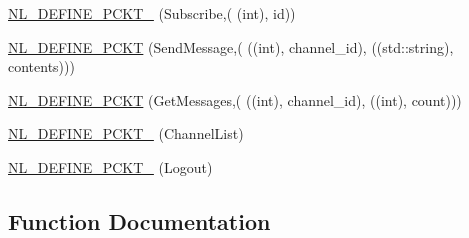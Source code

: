 \begin{DoxyCompactItemize}
\hyperlink{namespaceexample_1_1to__s_a29e3a089b479f8dd619fdbf4ebb6b6bd}{N\+L\+\_\+\+D\+E\+F\+I\+N\+E\+\_\+\+P\+C\+K\+T\+\_} (Subscribe,(                                                                                                   
                                                                                                           (int), id))
\item 
\hyperlink{namespaceexample_1_1to__s_acf8fc2468fd6df5ba81aee0681ab9b40}{N\+L\+\_\+\+D\+E\+F\+I\+N\+E\+\_\+\+P\+C\+K\+T} (Send\+Message,(                                                                                                                                                           
                                                                                                   ((int), channel\+\_\+id),                   
                                                                                                   ((std\+::string), contents)))
\item 
\hyperlink{namespaceexample_1_1to__s_aba7eca9145725bd852017768b0563163}{N\+L\+\_\+\+D\+E\+F\+I\+N\+E\+\_\+\+P\+C\+K\+T} (Get\+Messages,(                                                                                                                                   
                                                                                                   ((int), channel\+\_\+id),                                                                                                   ((int), count)))
\item 
\hyperlink{namespaceexample_1_1to__s_aaf777f6423de0654c5555ae32e182638}{N\+L\+\_\+\+D\+E\+F\+I\+N\+E\+\_\+\+P\+C\+K\+T\+\_} (Channel\+List)
\item 
\hyperlink{namespaceexample_1_1to__s_ac88cfa8b7faa1cb4b0718f43f951cdb9}{N\+L\+\_\+\+D\+E\+F\+I\+N\+E\+\_\+\+P\+C\+K\+T\+\_} (Logout)
\end{DoxyCompactItemize}


\subsection{Function Documentation}
\hypertarget{namespaceexample_1_1to__s_ac90e4002b4bbdae9f36a0614fe263e45}{}

